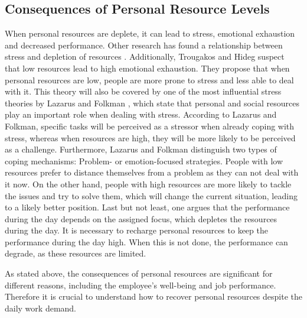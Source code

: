 \documentclass{hasel_thesis}
\begin{document}
\subsection{Consequences of Personal Resource Levels} \label{consequences_resources_levels}
When personal resources are deplete, it can lead to stress, emotional exhaustion and decreased performance.  
Other research has found a relationship between stress and depletion of resources \cite{Sonnentag.2001}. Additionally, Trougakos and Hideg \cite{Trougakos.2009} suspect that low resources lead to high emotional exhaustion. They propose that when personal resources are low, people are more prone to stress and less able to deal with it. This theory will also be covered by one of the most influential stress theories by Lazarus and Folkman \cite{Lazarus.1984}, which state that personal and social resources play an important role when dealing with stress. According to Lazarus and Folkman, specific tasks will be perceived as a stressor when already coping with stress, whereas when resources are high, they will be more likely to be perceived as a challenge.
Furthermore, Lazarus and Folkman \cite{Lazarus.1984} distinguish two types of coping mechanisms: Problem- or emotion-focused strategies. People with low resources prefer to distance themselves from a problem as they can not deal with it now. On the other hand, people with high resources are more likely to tackle the issues and try to solve them, which will change the current situation, leading to a likely better position.
Last but not least, one \cite{Trougakos.2009} argues that the performance during the day depends on the assigned focus, which depletes the resources during the day. It is necessary to recharge personal resources to keep the performance during the day high. When this is not done, the performance can degrade\cite{Trougakos.2009}, as these resources are limited.

As stated above, the consequences of personal resources are significant for different reasons, including the employee's well-being and job performance. Therefore it is crucial to understand how to recover personal resources despite the daily work demand.
 
\end{document}
